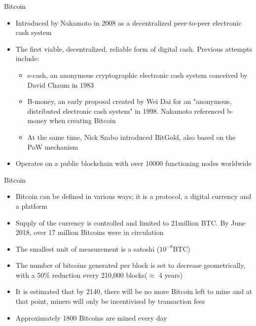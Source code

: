 \documentclass[10pt]{beamer}
\begin{document}

\begin{frame}{Bitcoin}
	\begin{itemize}
		\item Introduced by Nakamoto in 2008 as a decentralized peer-to-peer electronic cash system
		\item The first viable, decentralized, reliable form of digital cash. Previous attempts include:
		\begin{itemize}
			\item e-cash, an anonymous cryptographic electronic cash system conceived by David Chaum in 1983
			\item B-money, an early proposal created by Wei Dai for an "anonymous, distributed electronic cash system" in 1998. Nakamoto referenced b-money when creating Bitcoin
			\item At the same time, Nick Szabo introduced BitGold, also based on the PoW mechanism
		\end{itemize}
		\item Operates on a public blockchain with over 10000 functioning nodes worldwide
	\end{itemize}
\end{frame}



\begin{frame}{Bitcoin}
	\begin{itemize}
		\item Bitcoin can be defined in various ways; it is a protocol, a digital currency and a platform
		\item Supply of the currency is controlled and limited to 21million BTC. By June 2018, over 17 million Bitcoins were in circulation
		\item The smallest unit of measurement is a satoshi ($ 10^{-8}$BTC)
		\item The number of bitcoins generated per block is set to decrease geometrically, with a 50\% reduction every 210,000 blocks($\approx$ 4 years)
		\item It is estimated that by 2140, there will be no more Bitcoin left to mine and at that point, miners will only be incentivised by transaction fees
		\item Approximately 1800 Bitcoins are mined every day
		\end{itemize}
\end{frame}
\end{document}
